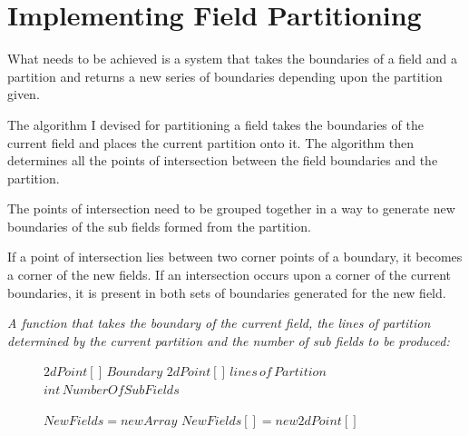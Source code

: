 \section{Implementing Field Partitioning}

What needs to be achieved is a system that takes the boundaries of a field and a partition and returns a  new series of boundaries depending upon the partition given. 


The algorithm I devised for partitioning a field takes the boundaries of the current field and places the current partition onto it.   The algorithm then determines all the points of intersection between the field boundaries and the partition.  

The points of intersection need to be grouped together in a way to generate new boundaries of the sub fields formed from the partition.  

If a point of intersection lies between two corner points of a boundary, it becomes a corner of the new fields.  If an intersection occurs upon a corner of the current boundaries, it is present in both sets of boundaries generated for the new field. 


\emph{A function that takes the boundary of the current field, the lines of partition determined by the current partition and the number of sub fields to be produced:}

\begin{figure}[H]
\begin{algorithmic}

\STATE $2dPoint[] \, Boundary$
\STATE $2dPoint[] \, lines\, of\, Partition$
\STATE $int\, NumberOfSubFields $ \\




\STATE $New Fields = new Array$ 
	\STATE $New Fields[]=new 2dPoint[]$
	
\ENDFOR

\end{algorithmic}
\end{figure}


